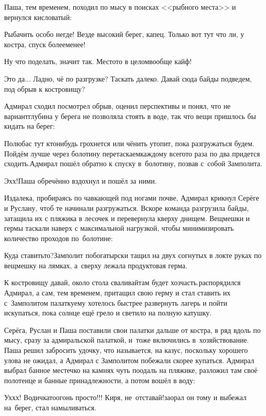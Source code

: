 Паша, тем временем, походил по мысу в поисках <<рыбного места>> и вернулся кисловатый:

\diagdash Рыбачить особо негде! Везде высокий берег, капец. Только вот тут что ли, у костра, спуск более\sdash менее!

\diagdash Ну что поделать, значит так. Место\sdash то в целом\mdash вообще кайф!

\diagdash Это да$\ldots$ Ладно, чё по разгрузке? Таскать далеко. Давай сюда байды подведем, под обрыв к костровищу? 

Адмирал сходил посмотрел обрыв, оценил перспективы и понял, что не вариант\mdash глубина у берега не позволяла стоять в воде, так что вещи пришлось бы кидать на берег:

\diagdash Полюбас тут кто\sdash нибудь грохнется или чё\sdash нить утопит, пока разгружаться будем. Пойдём лучше через болотину перетаскаем\mdash каждому всего\sdash то раза по два придется сходить.\mdash Адмирал пошёл обратно к спуску в~болотину, позвав с~собой Замполита.

\diagdash Эх\sdash х!\mdash Паша обречённо вздохнул и пошёл за ними.

Издалека, пробираясь по чавкающей под ногами почве, Адмирал крикнул Серёге и Руслану, чтоб те начинали разгружаться. Вскоре команда разгрузила байды, затащила их с пляжика в лесочек и перевернула кверху днищем. Вещмешки и гермы таскали наверх с максимальной нагрузкой, чтобы минимизировать количество проходов по~болотине: 

\diagdash Куда ставить\sdash то?\mdash Замполит по\sdash богатырски тащил на двух согнутых в локте руках по вещмешку на лямках, а~сверху лежала продуктовая герма.

\diagdash К костровищу давай, около стола сваливай\mdash там будет хозчасть.\mdash распорядился Адмирал, а сам, тем временем, притащил свою герму и стал ставить их с~Замполитом палатку\mdash ему хотелось быстрее развернуть лагерь и пойти искупаться, пока солнце ещё грело и светило на полную катушку.

Серёга, Руслан и Паша поставили свои палатки дальше от костра, в ряд вдоль по мысу, сразу за адмиральской палаткой, и~тоже включились в~хозяйствование. Паша решил забросить удочку, что называется, на казус, поскольку хорошего улова не ожидал, а Адмирал с Замполитом побежали скорее купаться. Адмирал выбрал банное местечко на камнях чуть поодаль на пляжике, разложил там своё полотенце и банные принадлежности, а потом вошёл в воду: 

\diagdash Ух\sdash х\sdash х! Водичка\sdash то\mdash огонь просто!!! Киря, не~отставай!\mdash заорал он тому и выбежал на~берег, стал намыливаться.

